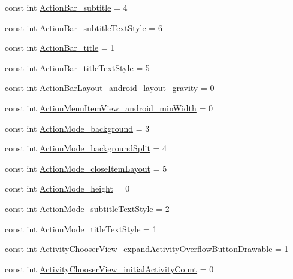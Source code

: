 \begin{CompactItemize}
\item 
const int \hyperlink{class__2doo_1_1_droid_1_1_resource_1_1_styleable_0c448ee1aff727bfd84d15299055ae04}{ActionBar\_\-subtitle} = 4
\item 
const int \hyperlink{class__2doo_1_1_droid_1_1_resource_1_1_styleable_3361fa23a460882eed7142883617dc01}{ActionBar\_\-subtitleTextStyle} = 6
\item 
const int \hyperlink{class__2doo_1_1_droid_1_1_resource_1_1_styleable_23368662d6a53b9370919abdf91d342f}{ActionBar\_\-title} = 1
\item 
const int \hyperlink{class__2doo_1_1_droid_1_1_resource_1_1_styleable_c64a54b1348e51341a69ee2cffbf690f}{ActionBar\_\-titleTextStyle} = 5
\item 
const int \hyperlink{class__2doo_1_1_droid_1_1_resource_1_1_styleable_0f6e770bdc63ad746aa4b029ad1a8c27}{ActionBarLayout\_\-android\_\-layout\_\-gravity} = 0
\item 
const int \hyperlink{class__2doo_1_1_droid_1_1_resource_1_1_styleable_618a6b9da59dffd6b124b9b96dbab4d6}{ActionMenuItemView\_\-android\_\-minWidth} = 0
\item 
const int \hyperlink{class__2doo_1_1_droid_1_1_resource_1_1_styleable_63e7605856e3505f2633019bea5498b7}{ActionMode\_\-background} = 3
\item 
const int \hyperlink{class__2doo_1_1_droid_1_1_resource_1_1_styleable_ceab334186fe5613975ef63e2e4fd5d1}{ActionMode\_\-backgroundSplit} = 4
\item 
const int \hyperlink{class__2doo_1_1_droid_1_1_resource_1_1_styleable_98a1094554850bb0875b3bc92e66cd0a}{ActionMode\_\-closeItemLayout} = 5
\item 
const int \hyperlink{class__2doo_1_1_droid_1_1_resource_1_1_styleable_8c5f1009271f18570ce8b9c0bb50079f}{ActionMode\_\-height} = 0
\item 
const int \hyperlink{class__2doo_1_1_droid_1_1_resource_1_1_styleable_d6cf0804a1f3e3a46154c9b15f4635ea}{ActionMode\_\-subtitleTextStyle} = 2
\item 
const int \hyperlink{class__2doo_1_1_droid_1_1_resource_1_1_styleable_196e939f6e1386f51ada9b8858b8ff61}{ActionMode\_\-titleTextStyle} = 1
\item 
const int \hyperlink{class__2doo_1_1_droid_1_1_resource_1_1_styleable_a5ae80784c5a96737d3c38f54c1fef19}{ActivityChooserView\_\-expandActivityOverflowButtonDrawable} = 1
\item 
const int \hyperlink{class__2doo_1_1_droid_1_1_resource_1_1_styleable_7950113a506d2e7dcf1464e4aa66e741}{ActivityChooserView\_\-initialActivityCount} = 0

\end{CompactItemize}
